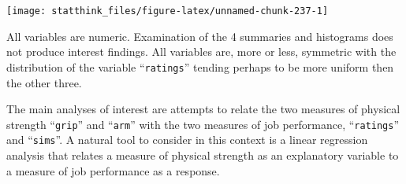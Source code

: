 \documentclass[]{krantz}
\makeatletter
\newenvironment{Shaded}{\begin{snugshade}}{\end{snugshade}}
\newcommand{\KeywordTok}[1]{\textcolor[rgb]{0.13,0.29,0.53}{\textbf{#1}}}
\newcommand{\DataTypeTok}[1]{\textcolor[rgb]{0.13,0.29,0.53}{#1}}
\newcommand{\DecValTok}[1]{\textcolor[rgb]{0.00,0.00,0.81}{#1}}
\newcommand{\CommentTok}[1]{\textcolor[rgb]{0.56,0.35,0.01}{\textit{#1}}}
\newcommand{\OperatorTok}[1]{\textcolor[rgb]{0.81,0.36,0.00}{\textbf{#1}}}
\newcommand{\NormalTok}[1]{#1}
\newenvironment{kframe}{%
\medskip{}
\setlength{\fboxsep}{.8em}
 \def\at@end@of@kframe{}%
 \ifinner\ifhmode%
  \def\at@end@of@kframe{\end{minipage}}%
  \begin{minipage}{\columnwidth}%
 \fi\fi%
 \def\FrameCommand##1{\hskip\@totalleftmargin \hskip-\fboxsep
 \colorbox{shadecolor}{##1}\hskip-\fboxsep
     \hskip-\linewidth \hskip-\@totalleftmargin \hskip\columnwidth}%
 \MakeFramed {\advance\hsize-\width
   \@totalleftmargin\z@ \linewidth\hsize
   \@setminipage}}%
 {\par\unskip\endMakeFramed%
 \at@end@of@kframe}
\renewenvironment{Shaded}{\begin{kframe}}{\end{kframe}}
\theoremstyle{definition}
\theoremstyle{definition}
\theoremstyle{definition}
\theoremstyle{remark}
\makeatother
\begin{document}
\begin{Shaded}
\end{Shaded}

\begin{center}\texttt{[image: statthink\_files/figure-latex/unnamed-chunk-237-1]} \end{center}

All variables are numeric. Examination of the 4 summaries and histograms
does not produce interest findings. All variables are, more or less,
symmetric with the distribution of the variable ``\texttt{ratings}''
tending perhaps to be more uniform then the other three.

The main analyses of interest are attempts to relate the two measures of
physical strength ``\texttt{grip}'' and ``\texttt{arm}'' with the two
measures of job performance, ``\texttt{ratings}'' and ``\texttt{sims}''.
A natural tool to consider in this context is a linear regression
analysis that relates a measure of physical strength as an explanatory
variable to a measure of job performance as a response.
\end{document}
